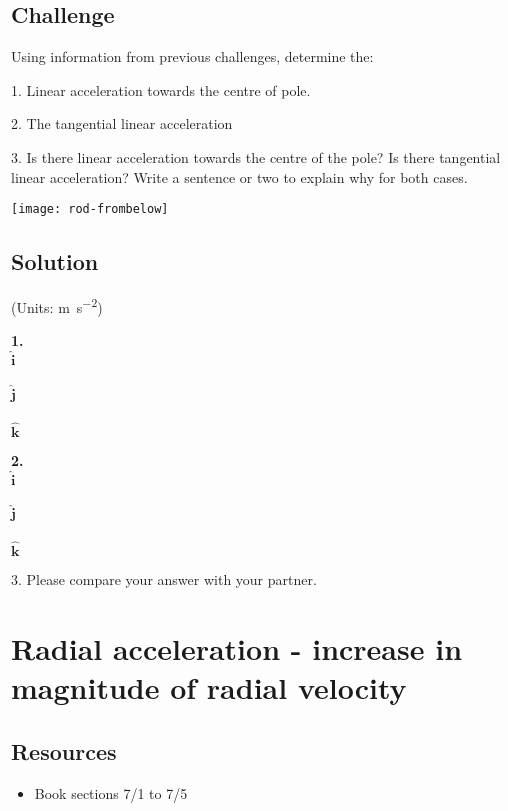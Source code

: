 \subsection*{Challenge}
Using information from previous challenges, determine the:

1. Linear acceleration towards the centre of pole.

2. The tangential linear acceleration

3. Is there linear acceleration towards the centre of the pole? Is there tangential linear acceleration? Write a sentence or two to explain why for both cases.

\texttt{[image: rod-frombelow]}


\subsection*{Solution}
(Units: \si{\meter\per\square\second})

\textbf{1.}\\
$\bm{\hat{i}}$\\
\\

$\bm{\hat{j}}$\\
\\

$\bm{\hat{k}}$\\

\textbf{2.}\\
$\bm{\hat{i}}$\\
\\

$\bm{\hat{j}}$\\
\\

$\bm{\hat{k}}$\\


3. Please compare your answer with your partner.




\newpage
\section{Radial acceleration - increase in magnitude of radial velocity}

\subsection*{Resources}
\begin{itemize}
    \item Book sections 7/1 to 7/5
\end{itemize}

